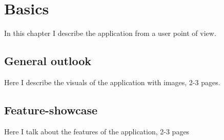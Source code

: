 \chapter{Basics}\label{ch:BASIC}

\begin{summary}
	In this chapter I describe the application from a user point of view.
\end{summary}

\section{General outlook}\label{sec:BASIC:go}
Here I describe the visuals of the application with images, 2-3 pages.


\section{Feature-showcase}\label{sec:BASIC:fs}
Here I talk about the features of the application, 2-3 pages
